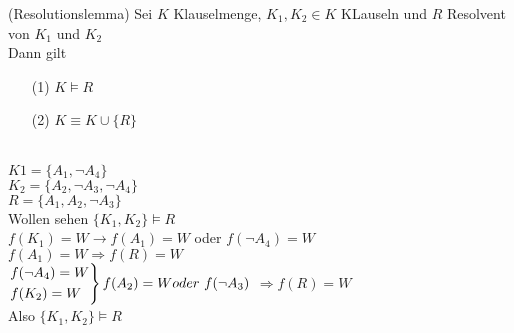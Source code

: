  (Resolutionslemma)
Sei $K$ Klauselmenge, $K_1, K_2 \in K$ KLauseln und $R$ Resolvent von $K_1$ und $K_2$\\

Dann gilt
\begin{enumerate}
\item[(1)] $K \models R$

\item[(2)] $K \equiv K \cup \{R\}$
\end{enumerate}

\beispiel{}\\
$K1 = \{A_1, \neg A_4\}$\\
$K_2 = \{ A_2, \neg A_3, \neg A_4\}$\\
$R = \{A_1, A_2, \neg A_3\}$\\
Wollen sehen $\{K_1, K_2\} \models R$\\
$f(K_1) = W \rightarrow f(A_1) = W $ oder $ f(\neg A_4) = W$\\

$f(A_1) = W \Rightarrow f(R)=W$\\
$\begin{rcases} f(\neg A_4) = W \\ f(K_2)=W \end{rcases} f(A_2) = W \\ oder\ f(\neg A_3)$
$\Rightarrow f(R) = W$\\
Also $\{K_1, K_2\} \models R$
